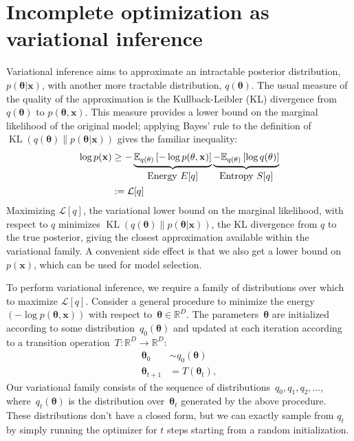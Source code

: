 \documentclass[]{article}
\newcommand{\vx}{\mathbf{x}}
\newcommand{\expectargs}[2]{\mathbb{E}_{#1} \left[ {#2} \right]}
\newcommand{\varL}{\mathcal{L}}
\DeclareMathOperator{\KLop}{KL}
\newcommand{\KL}[2]{\KLop \left(#1 \middle \| #2 \right)}
\newcommand{\data}{\vx}
\newcommand{\params}{\mathbf{\theta}}
\newcommand{\trans}{T}
\newcommand{\jointdist}{p(\params , \data)}
\newcommand{\posterior}{p(\params | \data)}
\newcommand{\reals}{\mathbb{R}}
\begin{document}
\section{Incomplete optimization as variational inference}
\label{sec:techintro}
Variational inference \citep{wainwright2008graphical} 
aims to approximate an intractable posterior distribution, $\posterior$, with another more tractable distribution, $q(\params)$.
The usual measure of the quality of the approximation is the Kullback-Leibler (KL) divergence from $q(\params)$ to $\jointdist$.
This measure provides a lower bound on the marginal likelihood of the original model;
applying Bayes' rule to the definition of $\KL{q(\params)}{\posterior}$ gives the familiar inequality:
%
\begin{align}
\log p(\data)
& \geq - \underbrace{\expectargs{q(\params)}{ -\log \jointdist }}_{\textnormal{\normalsize Energy $E[q]$}}
         \underbrace{- \expectargs{q(\params)}{\log  q(\params)}}_{\textnormal{\normalsize Entropy $S[q]$}} \nonumber \\
& := \varL[q] \label{eq:varbound}
\end{align}
%
Maximizing $\varL[q]$, the variational lower bound on the marginal likelihood, with respect to $q$ minimizes $\KL{q(\params)}{\posterior}$, the KL divergence from $q$ to the true posterior, giving the closest approximation available within the variational family.
A convenient side effect is that we also get a lower bound on $p(\data)$, which can be used for model selection.

To perform variational inference, we require a family of distributions over which to maximize $\varL[q]$. 
Consider a general procedure to minimize the energy~$(-\log\jointdist)$ with respect to~${\params \in \reals^D}$.
The parameters~$\params$ are initialized according to some distribution~$q_0(\params)$ and updated at each iteration according to a transition operation~${\trans : \reals^D \rightarrow \reals^D}$:
%
\begin{align}
\params_0 &\sim q_0(\params) \nonumber \\
\params_{t + 1} &= \trans(\params_t), \nonumber
\end{align}
%
Our variational family consists of the sequence of distributions~$q_0, q_1, q_2, \ldots$,
where~$q_t(\params)$ is the distribution over~$\params_t$ generated by the above procedure.
These distributions don't have a closed form, but we can exactly sample from $q_t$ by simply running the optimizer for $t$ steps starting from a random initialization.
\end{document}
